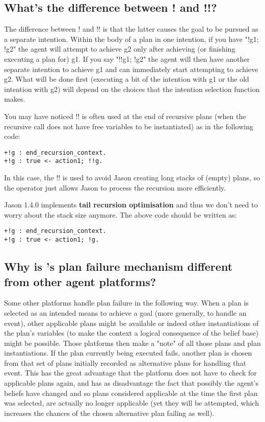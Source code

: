 \documentclass{article}
\newcommand{\jason}[0]{\htlink{\textit{Jason}}{http://jason.sf.net}\xspace}
\begin{document}
\begin{description}
\subsection{What's the difference between ! and !!?}

The difference between ! and !! is that the latter causes the goal to
be pursued as a separate intention. Within the body of a plan in one
intention, if you have "!g1; !g2" the agent will attempt to achieve g2
only after achieving (or finishing executing a plan for) g1.  If you
say "!!g1; !g2" the agent will then have another separate intention to
achieve g1 and can immediately start attempting to achieve g2. What
will be done first (executing a bit of the intention with g1 or the
old intention with g2) will depend on the choices that the intention
selection function makes. 

You may have noticed !! is often used at the end of recursive plans
(when the recursive call does not have free variables to be
instantiated) as in the following code:
\begin{verbatim}
+!g : end_recursion_context.
+!g : true <- action1; !!g.
\end{verbatim}
In this case, the !! is used to avoid Jason creating long stacks of
(empty) plans, so the operator just allows Jason to process the
recursion more efficiently. 

Jason 1.4.0 implements \textbf{tail recursion optimisation} and thus
we don't need to worry about the stack size anymore. The above code
should be written as:
\begin{verbatim}
+!g : end_recursion_context.
+!g : true <- action1; !g.
\end{verbatim}



\subsection{Why is \jason's plan failure mechanism different from
  other agent platforms?}

Some other platforms handle plan failure in the following way. When a
plan is selected as an intended means to achieve a goal (more
generally, to handle an event), other applicable plans might be
available or indeed other instantiations of the plan's variables (to
make the context a logical consequence of the belief base) might be
possible. Those platforms then make a "note" of all those plans and
plan instantiations. If the plan currently being executed fails,
another plan is chosen from that set of plans initially recorded as
alternative plans for handling that event. This has the great
advantage that the platform does not have to check for applicable
plans again, and has as disadvantage the fact that possibly the
agent's beliefs have changed and so plans considered applicable at the
time the first plan was selected, are actually no longer applicable
(yet they will be attempted, which increases the chances of the chosen
alternative plan failing as well).


\end{description}
\end{document}
